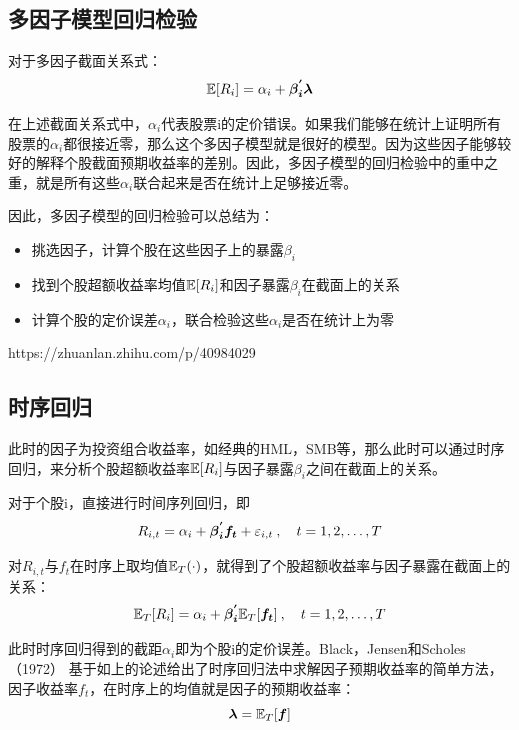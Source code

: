 \documentclass[11pt]{article}
\begin{document}
\subsection{多因子模型回归检验}

对于多因子截面关系式：
\begin{equation*}
    \mathbb{E}[R_i] = \alpha_i + \bm{\beta_{i}^{'} \lambda}
\end{equation*}

在上述截面关系式中，$\alpha_i$代表股票i的定价错误。如果我们能够在统计上证明所有股票的$\alpha_i$都很接近零，那么这个多因子模型就是很好的模型。因为这些因子能够较好的解释个股截面预期收益率的差别。因此，多因子模型的回归检验中的重中之重，就是所有这些$\alpha_i$联合起来是否在统计上足够接近零。

因此，多因子模型的回归检验可以总结为：
\begin{itemize}
    \item 挑选因子，计算个股在这些因子上的暴露$\beta_i$
    \item 找到个股超额收益率均值$\mathbb{E}[R_i]$和因子暴露$\beta_i$在截面上的关系
    \item 计算个股的定价误差$\alpha_i$，联合检验这些$\alpha_i$是否在统计上为零
\end{itemize}

https://zhuanlan.zhihu.com/p/40984029

\subsection{时序回归}

此时的因子为投资组合收益率，如经典的HML，SMB等，那么此时可以通过时序回归，来分析个股超额收益率$\mathbb{E}[R_i]$与因子暴露$\beta_i$之间在截面上的关系。

对于个股i，直接进行时间序列回归，即
\begin{equation*}
    R_{i,t} = \alpha_i + \bm{\beta_{i}^{'} f_t} + \varepsilon_{i,t} \:,\quad t=1,2,\dots,T
\end{equation*}

对$R_{i,t}$与$f_t$在时序上取均值$\mathbb{E}_T(\cdot)$，就得到了个股超额收益率与因子暴露在截面上的关系：
\begin{equation*}
    \mathbb{E}_T[R_i] = \alpha_i + \bm{\beta_{i}^{'}} \mathbb{E}_T[\bm{f_t}] \:,\quad t=1,2,\dots,T
\end{equation*}

此时时序回归得到的截距$\alpha_i$即为个股i的定价误差。Black，Jensen和Scholes（1972） 基于如上的论述给出了时序回归法中求解因子预期收益率的简单方法，因子收益率$f_t$，在时序上的均值就是因子的预期收益率：
\begin{equation*}
    \bm{\lambda} = \mathbb{E}_T[\bm{f}]
\end{equation*}
\end{document}
